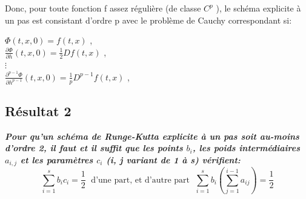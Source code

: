\documentclass[a4paper,12pt,landscape]{article}
\begin{document}
Donc, pour toute fonction f assez régulière (de classe $C^{p}$ ), le schéma explicite à un pas est consistant d’ordre p avec le problème de Cauchy correspondant si:\\
\begin{center}
$\Phi (t,x,0) = f(t,x)$ ,  \\
$\frac{\partial \Phi}{\partial h} (t,x,0) = \frac{1}{2}Df(t,x)$ , \\
$\vdots$ \\
$\frac{\partial^{p-1}\Phi}{\partial h^{p-1}} (t,x,0) = \frac{1}{p}D^{p-1}f(t,x)$ , \\
\end{center}


\subsection{Résultat 2}
{\it \bf Pour qu’un schéma de Runge-Kutta explicite à un pas soit au-moins d’ordre 2, il faut et il suffit que les points $b_{i}$, les poids intermédiaires $a_{i,j}$ et les paramètres $c_{i}$ (i, j variant de 1 à s) vérifient:} $$\sum_{i=1}^{s}b_{i}c_{i} = \frac{1}{2} \; \textrm{   d'une part, et d'autre part   } \; \sum_{i=1}^{s}b_{i}\left(\sum_{j=1}^{i-1}a_{ij}\right)= \frac{1}{2}$$
\end{document}
